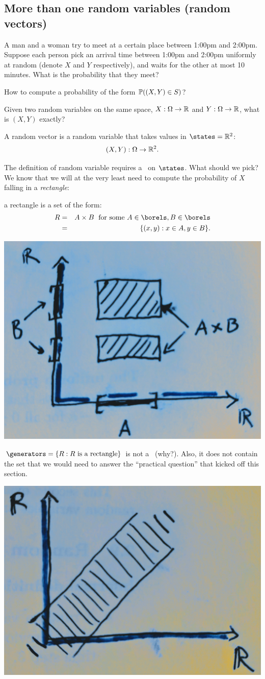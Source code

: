 \documentclass{article}
\begin{document}
\subsection{More than one random variables (random vectors)}\label{sec:random-vectors}

 A man and a woman try to meet at a certain place between 1:00pm and 2:00pm.  Suppose each person pick an arrival time between 1:00pm and 2:00pm uniformly at random (denote $X$ and $Y$ respectively), and waits for the other at most 10 minutes. What is the probability that they meet?

 How to compute a probability of the form $\P((X, Y) \in S)$?

 Given two random variables on the same space, $X: \Omega \to \R$ and $Y : \Omega \to \R$, what is $(X, Y)$ exactly?

 A random vector is a random variable that takes values in $\states = \R^2$: \[ (X, Y) : \Omega \to \R^2. \]

 The definition of random variable requires a \sigmaalg\ on $\states$. What should we pick? We know that we will at the very least need to compute the probability of $X$ falling in a \emph{rectangle}:

 a rectangle is a set of the form:
\begin{eqnarray} 
R &=& A \times B \;\text{ for some }A \in \borels, B \in \borels \\
&=& \{(x, y) : x \in A, y \in B\}.
\end{eqnarray}
\begin{center}
	\includegraphics[width=0.4\linewidth]{figures/product}
\end{center}

 $\generators = \{R : R\text{ is a rectangle}\}$ is not a \sigmaalg\ (why?). Also, it does not contain the set that we would need to answer the ``practical question'' that kicked off this section.
\begin{center}
	\includegraphics[width=0.4\linewidth]{figures/strip}
\end{center}
\end{document}
